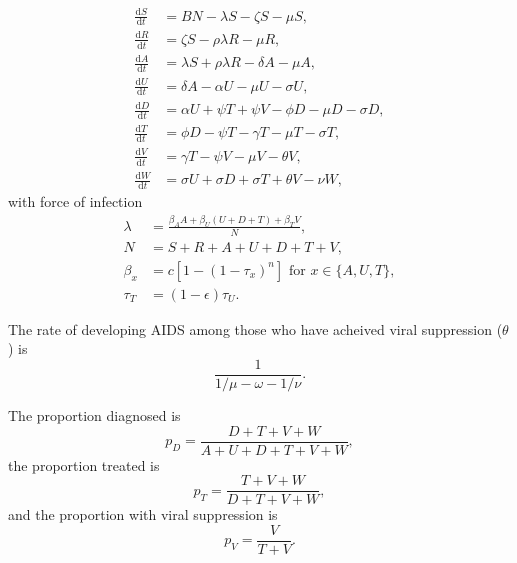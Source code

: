 \documentclass[11pt]{article}
\newcommand{\md}{\mathrm{d}}
\begin{document}
\begin{equation}
  \label{model_eqns}
  \begin{split}
    \frac{\md S}{\md t} &= B N - \lambda S - \zeta S- \mu S,
    \\
     \frac{\md R}{\md t} & = \zeta S - \rho \lambda R - \mu R,
    \\
    \frac{\md A}{\md t} &= \lambda S +\rho \lambda R - \delta A - \mu A,
    \\
    \frac{\md U}{\md t} &= \delta A - \alpha U - \mu U - \sigma U,
    \\
    \frac{\md D}{\md t} &=  \alpha U + \psi T + \psi V
    - \phi D - \mu D - \sigma D,
    \\
    \frac{\md T}{\md t} &= \phi D - \psi T - \gamma T - \mu T
    - \sigma T,
    \\
    \frac{\md V}{\md t} &= \gamma T - \psi V - \mu V - \theta V,
    \\
    \frac{\md W}{\md t} &= \sigma U + \sigma D + \sigma T + \theta V -
    \nu W,
  \end{split}
\end{equation}
with force of infection
\begin{equation}
  \label{force_of_infection}
  \begin{split}
    \lambda &= \frac{\beta_A A + \beta_U (U + D + T) + \beta_T V}{N},
    \\
    N &= S + R +  A + U + D + T + V,
    \\
    \beta_x &= c \left[1 - (1 - \tau_x)^n\right]
    \text{ for $x \in \{A, U, T\}$},
    \\
    \tau_T &= (1 - \epsilon) \tau_U.
  \end{split}
\end{equation}

The rate of developing AIDS  among those who have acheived
viral suppression ($\theta$) is
\begin{equation}
 \frac{1}{1/\mu-\omega-1/\nu}.
\end{equation}

The proportion diagnosed is
\begin{equation}
  p_D = \frac{D + T + V + W}{A + U + D + T + V + W},
\end{equation}
the proportion treated is
\begin{equation}
  p_T = \frac{T + V + W}{D + T + V + W},
\end{equation}
and the proportion with viral suppression is
\begin{equation}
  p_V = \frac{V}{T + V}.
\end{equation}
\end{document}
